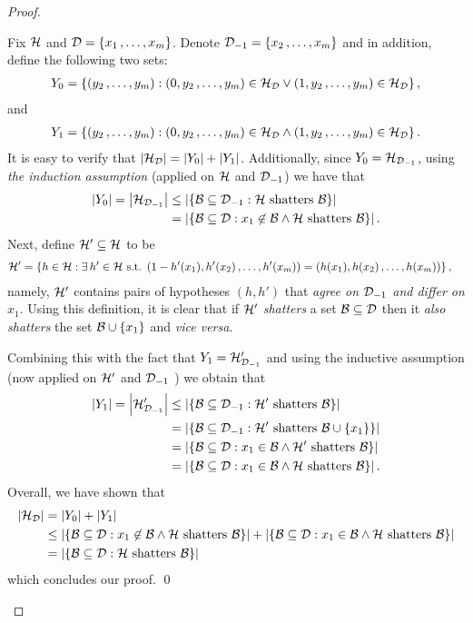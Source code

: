 \documentclass[11pt]{article}
\begin{document}
\begin{itemize}
\begin{proof}
\begin{enumerate}
Fix $\cH$ and $\cD = \set{x_1 \xdotx{,} x_m}$. Denote $\cD_{-1} = \set{x_2 \xdotx{,} x_m}$ and in addition, define the
following two sets:
\begin{align*}
Y_{0} = \set{(y_2 \xdotx{,} y_m): (0, y_2 \xdotx{,} y_m) \in \cH_{\cD} \lor  (1, y_2 \xdotx{,} y_m) \in \cH_{\cD}},
\end{align*}
and
\begin{align*}
Y_{1} = \set{(y_2 \xdotx{,} y_m): (0, y_2 \xdotx{,} y_m) \in \cH_{\cD} \land  (1, y_2 \xdotx{,} y_m) \in \cH_{\cD}}.
\end{align*}
It is easy to verify that $\abs{\cH_{\cD}} = \abs{Y_0} + \abs{Y_1}$. Additionally, since $Y_0 = \cH_{\cD_{-1}}$, using \emph{the induction assumption} (applied on $\cH$ and $\cD_{-1}$) we have that
\begin{align*}
\abs{Y_0} = \abs{\cH_{\cD_{-1}}} &\le \abs{\set{\cB \subseteq \cD_{-1}: \cH\text{ shatters }\cB}} \\
&=  \abs{\set{\cB \subseteq \cD: x_1 \not\in \cB \land \cH\text{ shatters }\cB}}.
\end{align*}
Next, define $\cH' \subseteq \cH$ to be
\begin{align*}
\cH'  &= \set{h \in \cH : \exists\,h' \in \cH\text{ s.t. }(1 - h'(x_1), h'(x_2) \xdotx{,} h'(x_m)) = (h(x_1), h(x_2)  \xdotx{,} h(x_m)) },
\end{align*}
namely, $\cH'$ contains pairs of hypotheses $(h, h')$ that \emph{agree on $\cD_{-1}$ and differ on $x_1$}. Using this definition, it is clear that if $\cH'$ \emph{shatters} a set $\cB \subseteq \cD$ then it \emph{also shatters} the set $\cB \cup \set{x_1}$ and \emph{vice versa}. 

Combining this with the fact that $Y_1 = \cH'_{\cD_{-1}}$ and using the inductive assumption (now applied on $\cH'$ and $\cD_{-1}$ ) we obtain that
\begin{align*}
\abs{Y_1} = \abs{ \cH'_{\cD_{-1}}} &\le \abs{\set{\cB \subseteq \cD_{-1}:  \cH'\text{ shatters }\cB }} \\
&= \abs{\set{\cB \subseteq \cD_{-1}:  \cH'\text{ shatters }\cB\cup\set{x_1} }} \\
&= \abs{\set{\cB \subseteq \cD:  x_1 \in \cB \land \cH'\text{ shatters }\cB }} \\
&= \abs{\set{\cB \subseteq \cD:  x_1 \in \cB \land \cH \text{ shatters }\cB }}.
\end{align*}
Overall, we have shown that
\begin{align*}
\abs{\cH_{\cD}} &= \abs{Y_0} + \abs{Y_1} \\
&\le \abs{\set{\cB \subseteq \cD: x_1 \not\in \cB \land \cH\text{ shatters }\cB}} +  \abs{\set{\cB \subseteq \cD:  x_1 \in \cB \land \cH \text{ shatters }\cB }}\\
&= \abs{\set{\cB \subseteq \cD: \cH\text{ shatters }\cB}}
\end{align*}
which concludes our proof. \qed
\end{enumerate}
\end{proof}
\end{itemize}
\end{document}
